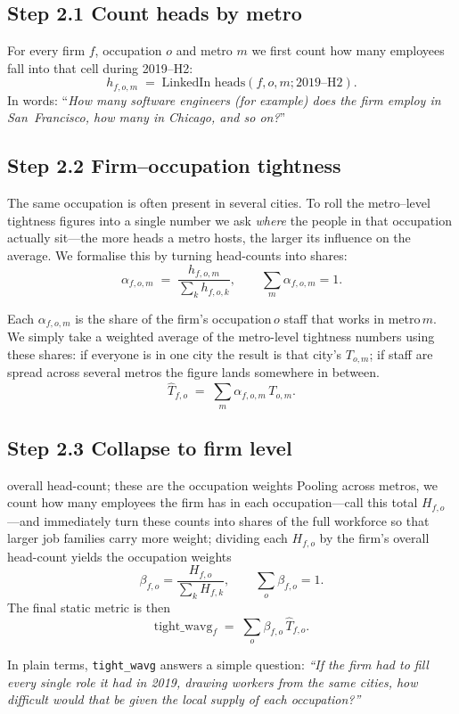 \documentclass[11pt]{article}
\begin{document}
\subsection*{Step 2.1\; Count heads by metro}
For every firm $f$, occupation $o$ and metro $m$ we first count how many
employees fall into that cell during 2019--H2:
\[
  h_{f,o,m} \;=\; \text{LinkedIn heads}(f, o, m; 2019\text{--H2}).
\]
In words: “\emph{How many software engineers (for example) does the firm
employ in San~Francisco, how many in Chicago, and so on?}”

\subsection*{Step 2.2\; Firm–occupation tightness}
The same occupation is often present in several cities.  To roll the
metro–level tightness figures into a single number we ask \emph{where}
the people in that occupation actually sit—the more heads a metro hosts,
the larger its influence on the average.  We formalise this by turning
head-counts into shares:
\[
  \alpha_{f,o,m} \;=\; \frac{h_{f,o,m}}{\sum_k h_{f,o,k}}, \qquad
  \sum_m \alpha_{f,o,m}=1.
\]

Each $\alpha_{f,o,m}$ is the share of the firm’s occupation\,$o$ staff
that works in metro\,$m$.  We simply take a weighted average of the
metro-level tightness numbers using these shares: if everyone is in one
city the result is that city’s $T_{o,m}$; if staff are spread across
several metros the figure lands somewhere in between.
\[
  \widehat T_{f,o}\;=\;\sum_m \alpha_{f,o,m}\,T_{o,m}. \tag{A1}
\]

\subsection*{Step 2.3\; Collapse to firm level}
overall head-count; these are the occupation weights
Pooling across metros, we count how many employees the firm has in each occupation—call this total $H_{f,o}$—and immediately turn these counts into shares of the full workforce so that larger job families carry more weight; dividing each $H_{f,o}$ by the firm’s overall head-count yields the occupation weights
\[
  \beta_{f,o}=\frac{H_{f,o}}{\sum_k H_{f,k}}, \qquad \textstyle\sum_o \beta_{f,o}=1.
\]
The final static metric is then
\[
  \boxed{\text{tight\_wavg}_f\;=\;\sum_o \beta_{f,o}\,\widehat T_{f,o}.} \tag{A2}
\]

In plain terms, \texttt{tight\_wavg} answers a simple question: 
\emph{“If the firm had to fill every single role it had in 2019, drawing
workers from the same cities, how difficult would that be given the
local supply of each occupation?”}
\end{document}
